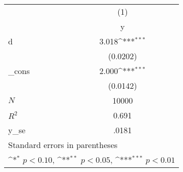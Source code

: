 {
\def\sym#1{\ifmmode^{#1}\else\(^{#1}\)\fi}
\begin{tabular}{l*{1}{c}}
\hline\hline
            &\multicolumn{1}{c}{(1)}\\
            &\multicolumn{1}{c}{y}\\
\hline
d           &       3.018\sym{***}\\
            &    (0.0202)         \\
[1em]
\_cons      &       2.000\sym{***}\\
            &    (0.0142)         \\
\hline
\(N\)       &       10000         \\
\(R^{2}\)   &       0.691         \\
y\_se        &       .0181         \\
\hline\hline
\multicolumn{2}{l}{\footnotesize Standard errors in parentheses}\\
\multicolumn{2}{l}{\footnotesize \sym{*} \(p<0.10\), \sym{**} \(p<0.05\), \sym{***} \(p<0.01\)}\\
\end{tabular}
}
